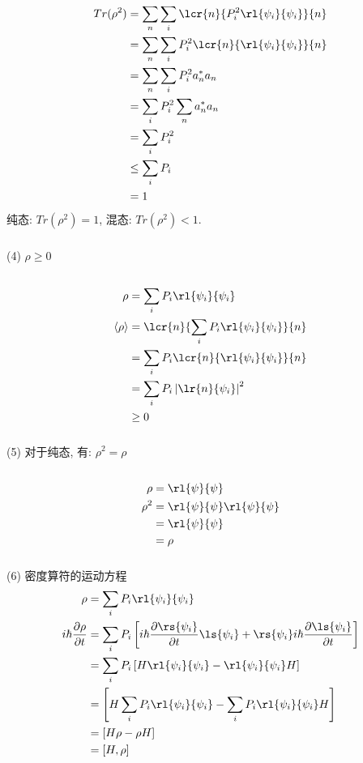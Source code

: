 \begin{frame} 
          \frametitle{}  
    \[ \begin{aligned}
        Tr(\rho^2) &= \sum_n \sum_i \lcr{n}{P^2_i\rl{\psi_i}{\psi_i}}{n} \\
        &= \sum_n \sum_i P^2_i\lcr{n}{\rl{\psi_i}{\psi_i}}{n}  \\
        &= \sum_n \sum_i P^2_i a_n^* a_n \\ 
        &= \sum_i P^2_i \sum_n a_n^* a_n \\ 
        &= \sum_i P^2_i \\ 
        &\leq \sum_i P_i \\ 
        &=1
      \end{aligned}\]
    纯态: $Tr(\rho^2) =1$, 混态: $Tr(\rho^2) < 1$. 
\end{frame}

\begin{frame} 
    \frametitle{}
       (4)  $\rho  \geq 0 $ \\ 
       \证~
    \[ \begin{aligned}
        \rho & = \sum_i P_i\rl{\psi_i}{\psi_i} \\ 
        \left\langle \rho \right\rangle &= 
        \lcr{n}{\sum_i P_i\rl{\psi_i}{\psi_i}}{n} \\ 
        &= \sum_i P_i \lcr{n}{\rl{\psi_i}{\psi_i}}{n}  \\
        &= \sum_i P_i \left|\lr{n}{\psi_i} \right|^2 \\
        & \geq 0
      \end{aligned}\]   
   \end{frame}

\begin{frame} 
 \frametitle{}
      (5) 对于纯态, 有: $\rho^2 =\rho$ \\ 
      \证~
      \[ \begin{aligned}
        \rho &= \rl{\psi}{\psi}  \\ 
        \rho^2 &= \rl{\psi}{\psi} \rl{\psi}{\psi}  \\ 
        &= \rl{\psi}{\psi}  \\ 
        &=  \rho 
      \end{aligned}\]
\end{frame}

\begin{frame} 
\frametitle{}
   (6) 密度算符的运动方程
   \[ \begin{aligned}
    \rho &= \sum_i P_i\rl{\psi_i}{\psi_i}  \\
     i \hbar \frac{\partial \rho}{\partial t} &= \sum_i P_i \left[i \hbar\frac{\partial \rs{\psi_i}}{\partial t}\ls{\psi_i}+ \rs{\psi_i}i \hbar\frac{\partial \ls{\psi_i}}{\partial t}\right] \\ 
     &=  \sum_i P_i \left[ H \rl{\psi_i}{\psi_i} -  \rl{\psi_i}{\psi_i} H \right] \\ 
     &=   \left[ H \sum_i P_i\rl{\psi_i}{\psi_i} - \sum_i P_i \rl{\psi_i}{\psi_i} H \right] \\ 
     &= [H \rho- \rho H] \\ 
     &= [H, \rho]
   \end{aligned}\] 
\end{frame}


